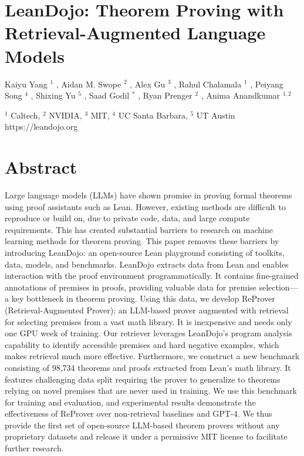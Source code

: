 \documentclass[
]{article}
\author{}
\date{}
\begin{document}
\section{LeanDojo: Theorem Proving with Retrieval-Augmented Language
Models}\label{leandojo-theorem-proving-with-retrieval-augmented-language-models}

Kaiyu Yang \(^{1}\) , Aidan M. Swope \(^{2}\) , Alex Gu \(^{3}\) , Rahul
Chalamala \(^{1}\) , Peiyang Song \(^{4}\) , Shixing Yu \(^{5}\) , Saad
Godil \(^{*}\) , Ryan Prenger \(^{2}\) , Anima Anandkumar \(^{1,2}\)

\(^{1}\) Caltech, \(^{2}\) NVIDIA, \(^{3}\) MIT, \(^{4}\) UC Santa
Barbara, \(^{5}\) UT Austin https://leandojo.org

\section{Abstract}\label{abstract}

Large language models (LLMs) have shown promise in proving formal
theorems using proof assistants such as Lean. However, existing methods
are difficult to reproduce or build on, due to private code, data, and
large compute requirements. This has created substantial barriers to
research on machine learning methods for theorem proving. This paper
removes these barriers by introducing LeanDojo: an open-source Lean
playground consisting of toolkits, data, models, and benchmarks.
LeanDojo extracts data from Lean and enables interaction with the proof
environment programmatically. It contains fine-grained annotations of
premises in proofs, providing valuable data for premise selection---a
key bottleneck in theorem proving. Using this data, we develop ReProver
(Retrieval-Augmented Prover): an LLM-based prover augmented with
retrieval for selecting premises from a vast math library. It is
inexpensive and needs only one GPU week of training. Our retriever
leverages LeanDojo's program analysis capability to identify accessible
premises and hard negative examples, which makes retrieval much more
effective. Furthermore, we construct a new benchmark consisting of
98,734 theorems and proofs extracted from Lean's math library. It
features challenging data split requiring the prover to generalize to
theorems relying on novel premises that are never used in training. We
use this benchmark for training and evaluation, and experimental results
demonstrate the effectiveness of ReProver over non-retrieval baselines
and GPT-4. We thus provide the first set of open-source LLM-based
theorem provers without any proprietary datasets and release it under a
permissive MIT license to facilitate further research.
\end{document}
